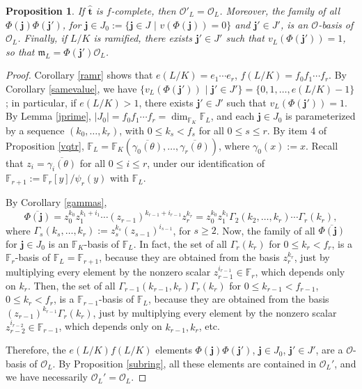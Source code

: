 \documentclass{amsart}
\newtheorem{proposition}[theorem]{Proposition}
\def\ff#1{\mathbb{F}_{#1}}
\def\g{\Gamma}
\def\ga{\gamma}
\def\gb#1{\overline{\gamma_{#1}(\t)}}
\def\j{\mathbf{j}}
\def\m{{\mathfrak m}}
\def\ol{{\mathcal O}_L}
\def\oo{{\mathcal O}}
\def\t{\theta}
\def\tt{\hat{\mathbf{t}}}
\def\tq{\,\,|\,\,}
\begin{document}
\begin{proposition}\label{oo=}
If $\tt$ is $f$-complete, then $\oo'_L=\oo_L$. Moreover, the family of all $\Phi(\j)\Phi(\j')$, for $\j\in J_0:=\{\j\in J\tq v(\Phi(\j))=0\}$ and $\j'\in J'$, is an $\oo$-basis of $\oo_L$. Finally, if $L/K$ is ramified, there exists $\j'\in J'$ such that
 $v_L(\Phi(\j'))=1$, so that $\m_L=\Phi(\j')\oo_L$.
\end{proposition}

\begin{proof}
Corollary \ref{ramr} shows that $e(L/K)=e_1\cdots e_r$, $f(L/K)=f_0f_1\cdots f_r$. 
By Corollary \ref{samevalue}, we have $\{v_L(\Phi(\j'))\tq\j'\in J'\}=\{0,1,\dots,e(L/K)-1\}$; in particular, if $e(L/K)>1$, there exists $\j'\in J'$ such that $v_L(\Phi(\j'))=1$. By Lemma \ref{jprime}, $|J_0|=f_0f_1\cdots f_r=\dim_{\ff{K}}\ff{L}$, and each $\j\in J_0$ is parameterized by a sequence $(k_0,\dots,k_r)$, with $0\le k_s<f_s$ for all $0\le s\le r$.
By item 4 of Proposition \ref{vqtr}, $\ff{L}=\ff{K}(\gb0,\dots,\gb{r})$, where $\ga_0(x):=x$. Recall that $z_i=\gb{i}$ for all $0\le i\le r$, under our identification of $\ff{r+1}:=\ff{r}[y]/\psi_r(y)$ with $\ff{L}$.

By Corollary \ref{gammas},
$$\overline{\Phi(\j)}=z_0^{k_0}z_1^{k_1+i_1}\cdots (z_{r-1})^{k_{r-1}+i_{r-1}} z_r^{k_r}=
z_0^{k_0}z_1^{k_1}\g_2(k_2,\dots,k_r)\cdots \g_r(k_r),$$
where $\g_s(k_s,\dots,k_r):=z_s^{k_s}(z_{s-1})^{i_{s-1}}$, for $s\ge 2$. Now,
the family of all $\overline{\Phi(\j)}$ for $\j\in J_0$ is an $\ff{K}$-basis of $\ff{L}$. In fact, the set of all $\g_r(k_r)$ for $0\le k_r<f_r$, is a $\ff{r}$-basis of $\ff{L}=\ff{r+1}$, because they are obtained from the basis $z_r^{k_r}$, just by multiplying every element by the nonzero scalar $z_{r-1}^{i_{r-1}}\in\ff{r}$, which depends only on $k_r$. Then, the set of all $\g_{r-1}(k_{r-1},k_r)\g_r(k_r)$ for $0\le k_{r-1}<f_{r-1}$, $0\le k_r<f_r$, is a $\ff{r-1}$-basis of $\ff{L}$, because they are obtained from the basis $(z_{r-1})^{k_{r-1}}\g_r(k_r)$, just by multiplying every element by the nonzero scalar $z_{r-2}^{i_{r-2}}\in\ff{r-1}$, which depends only on $k_{r-1},k_r$, etc.

Therefore, the $e(L/K)f(L/K)$ elements $\Phi(\j)\Phi(\j')$, $\j\in J_0$, $\j'\in J'$, are a $\oo$-basis of $\ol$. By Proposition \ref{subring}, all these elements are contained in $\ol'$, and we have necessarily $\ol'=\ol$. 
\end{proof}
\end{document}
